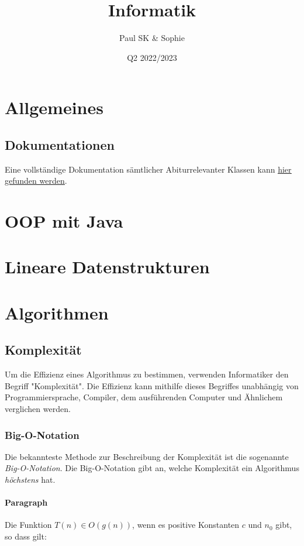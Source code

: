 \documentclass{article}
\title{Informatik}
\date{Q2 2022/2023}
\author{Paul SK \& Sophie}
\begin{document}
	\maketitle
	\newpage


	\section{Allgemeines}
	\subsection{Dokumentationen}
	Eine vollständige Dokumentation sämtlicher Abiturrelevanter Klassen kann \href{https://www.schulentwicklung.nrw.de/lehrplaene/upload/klp\_SII/if/Dokumentation\_ZA-IF\_GK-LK\_ab\_2018\_2021\_12\_22.pdf}{\underline{hier gefunden werden}}.

	\section{OOP mit Java}

	\section{Lineare Datenstrukturen}

	\section{Algorithmen}
	\subsection{Komplexität}
	Um die Effizienz eines Algorithmus zu bestimmen, verwenden Informatiker den Begriff "Komplexität". Die Effizienz kann mithilfe dieses Begriffes unabhängig von Programmiersprache, Compiler, dem ausführenden Computer und Ähnlichem verglichen werden.
	\subsubsection{Big-O-Notation}
	Die bekannteste Methode zur Beschreibung der Komplexität ist die sogenannte \textit{Big-O-Notation}. Die Big-O-Notation gibt an, welche Komplexität ein Algorithmus \textit{höchstens} hat.
	
	\paragraph{Paragraph}
	Die Funktion $T(n) \in O(g(n))$, wenn es positive Konstanten $c$ und $n_0$ gibt, so dass gilt: 
\end{document}
